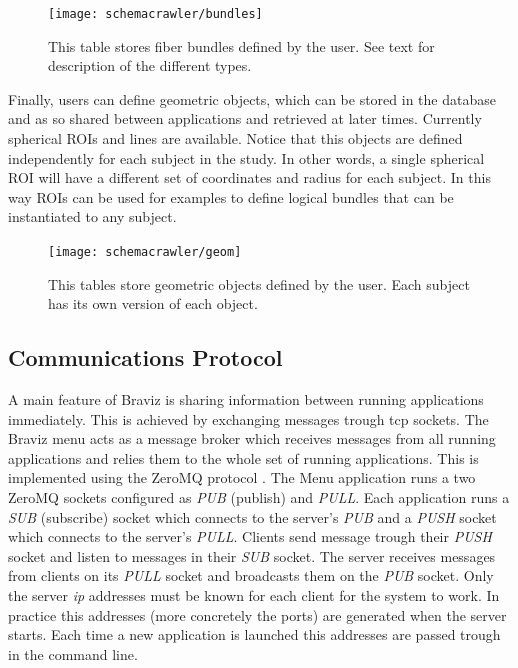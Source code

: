 \begin{figure}
\centering
\texttt{[image: schemacrawler/bundles]}%
\caption{\label{fig_db_bundles} This table stores fiber bundles defined by the user. See text for description of the different types.}
\end{figure}

Finally, users can define geometric objects, which can be stored in the database and as so shared between applications and retrieved at later times. Currently spherical ROIs and lines are available. Notice that this objects are defined independently for each subject in the study. In other words, a single spherical ROI will have a different set of coordinates and radius for each subject. In this way ROIs can be used for examples to define logical bundles that can be instantiated to any subject.

\begin{figure}
\centering
\texttt{[image: schemacrawler/geom]}%
\caption{\label{fig_db_geom} This tables store geometric objects defined by the user. Each subject has its own version of each object.}
\end{figure}

\subsection{Communications Protocol}

A main feature of Braviz is sharing information between running applications immediately. This is achieved by exchanging messages trough tcp sockets. The Braviz menu acts as a message broker which receives messages from all running applications and relies them to the whole set of running applications. This is implemented using the ZeroMQ protocol \autocite{hintjens_zeromq:_2013}. The Menu application runs a two ZeroMQ sockets configured as \emph{PUB} (publish) and \emph{PULL}. Each application runs a \emph{SUB} (subscribe) socket which connects to the server's \emph{PUB} and a \emph{PUSH} socket which connects to the server's \emph{PULL}. Clients send message trough their \emph{PUSH} socket and listen to messages in their \emph{SUB} socket. The server receives messages from clients on its \emph{PULL} socket and broadcasts them on the \emph{PUB} socket. Only the server \emph{ip} addresses must be known for each client for the system to work. In practice this addresses (more concretely the ports) are generated when the server starts. Each time a new application is launched this addresses are passed trough in the command line. 

